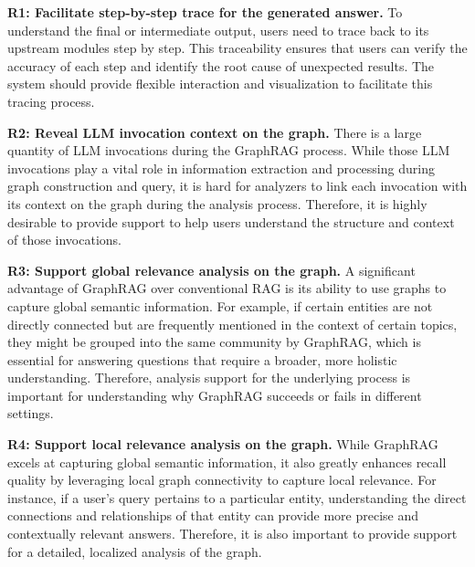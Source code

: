 \textbf{R1: Facilitate step-by-step trace for the generated answer.} To understand the final or intermediate output, users need to trace back to its upstream modules step by step. This traceability ensures that users can verify the accuracy of each step and identify the root cause of unexpected results. The system should provide flexible interaction and visualization to facilitate this tracing process.

\textbf{R2: Reveal LLM invocation context on the graph.} There is a large quantity of LLM invocations during the GraphRAG process. While those LLM invocations play a vital role in information extraction and processing during graph construction and query, it is hard for analyzers to link each invocation with its context on the graph during the analysis process. Therefore, it is highly desirable to provide support to help users understand the structure and context of those invocations.

\textbf{R3: Support global relevance analysis on the graph.} A significant advantage of GraphRAG over conventional RAG is its ability to use graphs to capture global semantic information. For example, if certain entities are not directly connected but are frequently mentioned in the context of certain topics, they might be grouped into the same community by GraphRAG, which is essential for answering questions that require a broader, more holistic understanding. Therefore, analysis support for the underlying process is important for understanding why GraphRAG succeeds or fails in different settings.

\textbf{R4: Support local relevance analysis on the graph.} While GraphRAG excels at capturing global semantic information, it also greatly enhances recall quality by leveraging local graph connectivity to capture local relevance. For instance, if a user's query pertains to a particular entity, understanding the direct connections and relationships of that entity can provide more precise and contextually relevant answers. Therefore, it is also important to provide support for a detailed, localized analysis of the graph.